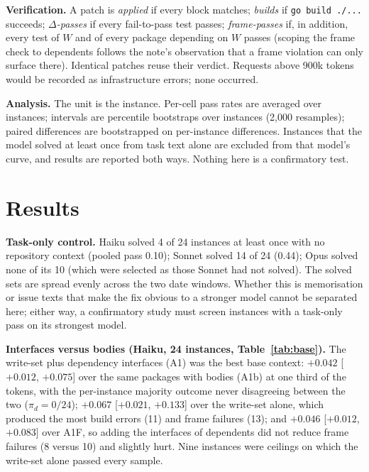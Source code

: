 \documentclass[10pt]{article}
\begin{document}
\textbf{Verification.} A patch is \emph{applied} if every block matches; \emph{builds} if \texttt{go build ./...} succeeds; \emph{$\Delta$-passes} if every fail-to-pass test passes; \emph{frame-passes} if, in addition, every test of $W$ and of every package depending on $W$ passes (scoping the frame check to dependents follows the note's observation that a frame violation can only surface there). Identical patches reuse their verdict. Requests above 900k tokens would be recorded as infrastructure errors; none occurred.

\textbf{Analysis.} The unit is the instance. Per-cell pass rates are averaged over instances; intervals are percentile bootstraps over instances (2,000 resamples); paired differences are bootstrapped on per-instance differences. Instances that the model solved at least once from task text alone are excluded from that model's curve, and results are reported both ways. Nothing here is a confirmatory test.

\section{Results}

\textbf{Task-only control.} Haiku solved 4 of 24 instances at least once with no repository context (pooled pass 0.10); Sonnet solved 14 of 24 (0.44); Opus solved none of its 10 (which were selected as those Sonnet had not solved). The solved sets are spread evenly across the two date windows. Whether this is memorisation or issue texts that make the fix obvious to a stronger model cannot be separated here; either way, a confirmatory study must screen instances with a task-only pass on its strongest model.

\textbf{Interfaces versus bodies (Haiku, 24 instances, Table~\ref{tab:base}).} The write-set plus dependency interfaces (A1) was the best base context: $+0.042$ [$+0.012$, $+0.075$] over the same packages with bodies (A1b) at one third of the tokens, with the per-instance majority outcome never disagreeing between the two ($\pi_d = 0/24$); $+0.067$ [$+0.021$, $+0.133$] over the write-set alone, which produced the most build errors (11) and frame failures (13); and $+0.046$ [$+0.012$, $+0.083$] over A1F, so adding the interfaces of dependents did not reduce frame failures (8 versus 10) and slightly hurt. Nine instances were ceilings on which the write-set alone passed every sample.
\end{document}

